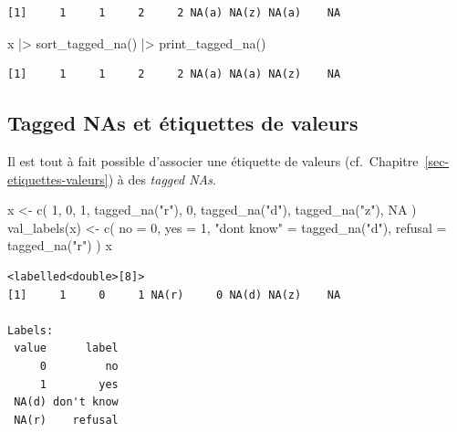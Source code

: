 \documentclass[
  letterpaper,
  DIV=11,
  numbers=noendperiod,
  oneside]{scrreprt}
\newenvironment{Shaded}{\begin{snugshade}}{\end{snugshade}}
\newcommand{\AttributeTok}[1]{\textcolor[rgb]{0.40,0.45,0.13}{#1}}
\newcommand{\ConstantTok}[1]{\textcolor[rgb]{0.56,0.35,0.01}{#1}}
\newcommand{\DecValTok}[1]{\textcolor[rgb]{0.68,0.00,0.00}{#1}}
\newcommand{\FunctionTok}[1]{\textcolor[rgb]{0.28,0.35,0.67}{#1}}
\newcommand{\NormalTok}[1]{\textcolor[rgb]{0.00,0.23,0.31}{#1}}
\newcommand{\OtherTok}[1]{\textcolor[rgb]{0.00,0.23,0.31}{#1}}
\newcommand{\SpecialCharTok}[1]{\textcolor[rgb]{0.37,0.37,0.37}{#1}}
\newcommand{\StringTok}[1]{\textcolor[rgb]{0.13,0.47,0.30}{#1}}
\begin{document}
\begin{verbatim}
[1]     1     1     2     2 NA(a) NA(z) NA(a)    NA
\end{verbatim}

\begin{Shaded}
\begin{Highlighting}[]
\NormalTok{x }\SpecialCharTok{|\textgreater{}} 
  \FunctionTok{sort\_tagged\_na}\NormalTok{()  }\SpecialCharTok{|\textgreater{}} 
  \FunctionTok{print\_tagged\_na}\NormalTok{()}
\end{Highlighting}
\end{Shaded}

\begin{verbatim}
[1]     1     1     2     2 NA(a) NA(a) NA(z)    NA
\end{verbatim}

\hypertarget{tagged-nas-et-uxe9tiquettes-de-valeurs}{%
\subsection{Tagged NAs et étiquettes de
valeurs}\label{tagged-nas-et-uxe9tiquettes-de-valeurs}}

Il est tout à fait possible d'associer une étiquette de valeurs
(cf.~Chapitre~\ref{sec-etiquettes-valeurs}) à des \emph{tagged NAs}.

\begin{Shaded}
\begin{Highlighting}[]
\NormalTok{x }\OtherTok{\textless{}{-}} \FunctionTok{c}\NormalTok{(}
  \DecValTok{1}\NormalTok{, }\DecValTok{0}\NormalTok{, }
  \DecValTok{1}\NormalTok{, }\FunctionTok{tagged\_na}\NormalTok{(}\StringTok{"r"}\NormalTok{), }
  \DecValTok{0}\NormalTok{, }\FunctionTok{tagged\_na}\NormalTok{(}\StringTok{"d"}\NormalTok{), }
  \FunctionTok{tagged\_na}\NormalTok{(}\StringTok{"z"}\NormalTok{), }\ConstantTok{NA}
\NormalTok{)}
\FunctionTok{val\_labels}\NormalTok{(x) }\OtherTok{\textless{}{-}} \FunctionTok{c}\NormalTok{(}
  \AttributeTok{no =} \DecValTok{0}\NormalTok{, }
  \AttributeTok{yes =} \DecValTok{1}\NormalTok{,}
  \StringTok{"don\textquotesingle{}t know"} \OtherTok{=} \FunctionTok{tagged\_na}\NormalTok{(}\StringTok{"d"}\NormalTok{),}
  \AttributeTok{refusal =} \FunctionTok{tagged\_na}\NormalTok{(}\StringTok{"r"}\NormalTok{)}
\NormalTok{)}
\NormalTok{x}
\end{Highlighting}
\end{Shaded}

\begin{verbatim}
<labelled<double>[8]>
[1]     1     0     1 NA(r)     0 NA(d) NA(z)    NA

Labels:
 value      label
     0         no
     1        yes
 NA(d) don't know
 NA(r)    refusal
\end{verbatim}
\end{document}
